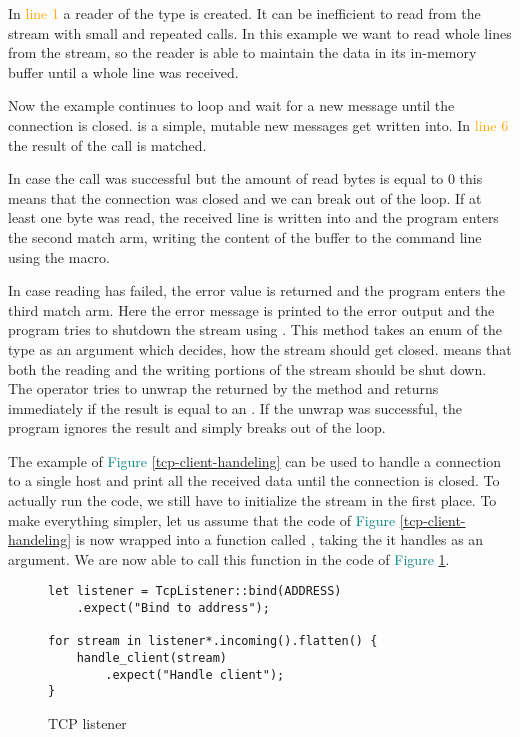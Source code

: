 In \textcolor{orange}{line 1} a reader of the type  is created. It can be inefficient to read
from the stream with small and repeated calls. In this example we want to read whole lines from the stream, so the
reader is able to maintain the data in its in-memory buffer until a whole line was received.

Now the example continues to loop and wait for a new message until the connection is closed.  is a simple,
mutable  new messages get written into. In \textcolor{orange}{line 6} the result of the call
 is matched.

In case the call was successful but the amount of read bytes is equal to 0 this means that the connection was closed
and we can break out of the loop. If at least one byte was read, the received line is written into  and the
program enters the second match arm, writing the content of the buffer to the command line using the
 macro.

In case reading has failed, the error value is returned and the program enters the third match arm. Here the error
message is printed to the error output and the program tries to shutdown the stream using
. This method takes an enum of the type  as an argument which
decides, how the stream should get closed.  means that both the reading and the writing portions of the
stream should be shut down. The  operator tries to unwrap the  returned by the method and returns
immediately if the result is equal to an . If the unwrap was successful, the program ignores the result and
simply breaks out of the loop.

The example of \textcolor{teal}{Figure \ref{tcp-client-handeling}} can be used to handle a connection to a single host
and print all the received data until the connection is closed. To actually run the code, we still have to initialize
the stream in the first place. To make everything simpler, let us assume that the code of
\textcolor{teal}{Figure \ref{tcp-client-handeling}} is now wrapped into a function called , taking
the  it handles as an argument. We are now able to call this function in the code of
\textcolor{teal}{Figure \ref{tcp-listener}}.

\begin{figure}[ht]
    \begin{verbatim}
let listener = TcpListener::bind(ADDRESS)
    .expect("Bind to address");

for stream in listener*.incoming().flatten() {
    handle_client(stream)
        .expect("Handle client");
}
    \end{verbatim}
    \caption{TCP listener}
    \label{tcp-listener}
\end{figure}

